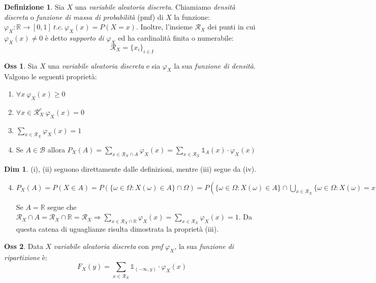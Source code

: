 \documentclass[12pt, a4paper]{report}
\theoremstyle{definition}
\newtheorem{definition}{Definizione}[section]
\newtheorem*{demonstration}{Dim}
\newtheorem*{observation}{Oss}
\DeclareRobustCommand{\R}{\mathbb{R}}%
\DeclareRobustCommand{\B}{\mathcal{B}}%
\DeclareRobustCommand{\supp}{\mathcal{R}}%
\DeclareRobustCommand{\one}{\mathds{1}}
\begin{document}
\begin{definition}
	Sia $X$ una \emph{variabile aleatoria discreta}. Chiamiamo \emph{densità
	discreta} o \emph{funzione di massa di probabilità} (pmf) di $X$ la
	funzione: \(\varphi_X:\R\rightarrow [0,1]\ t.c.\ \varphi_X(x)=P(X=x)\).
	Inoltre, l'insieme $\supp_X$ dei punti in cui \(\varphi_X(x)\neq 0\) è detto
	\emph{supporto di $\varphi_X$} ed ha cardinalità finita o numerabile:
	\[\supp_X=\{x_i\}_{i\in I}\]
\end{definition}

\begin{observation}
	Sia $X$ una \emph{variabile aleatoria discreta} e sia $\varphi_X$ la sua
	\emph{funzione di densità}. Valgono le seguenti proprietà:
	\begin{enumerate}[label=(\roman*)]
		\item \(\forall x\ \varphi_X(x) \geq 0\)
		\item \(\forall x\in\supp_X^c\ \varphi_X(x)=0\)
		\item \(\sum_{x\in\supp_X}\varphi_X(x)=1\)
		\item Se \(A\in\B\) allora \(P_X(A)=\sum_{x\in\supp_X\cap A}\varphi_X(x)
		=\sum_{x\in\supp_X}\one_A(x)\cdot \varphi_X(x)\)
	\end{enumerate}
\end{observation}

\begin{demonstration}
	(i), (ii) seguono direttamente dalle definizioni, mentre (iii) segue da (iv).
	\begin{enumerate}[label=(\roman*)]
		\setcounter{enumi}{3}
		\item \(P_X(A)=P(X\in A)=P(\{\omega\in\Omega:X(\omega)\in A\}\cap\Omega)
		=P(\{\omega\in\Omega:X(\omega)\in A\}\cap\bigcup_{x\in\supp_X}\{\omega
		\in\Omega:X(\omega)=x\})=P(\bigcup_{x\in\supp_X}(\{\omega\in\Omega:
		X(\omega)\in A)\}\cap\{\omega\in\Omega:X(\omega)=x\}))=\sum_{x\in\supp_X}
		P((X\in A)\cap(X=x))=\sum_{x\in\supp_X}\one_A(x)\cdot \varphi_X(x)=\sum_{x\in
		\supp_X\cap A}\varphi_X(x)\)

		Se \(A=\R\) segue che \(\supp_X\cap A=\supp_X\cap\R=\supp_X\Rightarrow
		\sum_{x\in\supp_X\cap\R}\varphi_X(x)=\sum_{x\in\supp_X}\varphi_X(x)=1\).
		Da questa catena di uguaglianze risulta dimostrata la proprietà (iii).
	\end{enumerate}
\end{demonstration}

\begin{observation}
	Data $X$ \emph{variabile aleatoria discreta} con \emph{pmf} $\varphi_X$, la
	sua \emph{funzione di ripartizione} è:
	\[F_X(y)=\sum_{x\in\supp_X}\one_{(-\infty,y)}\cdot \varphi_X(x)\]
\end{observation}
\end{document}
